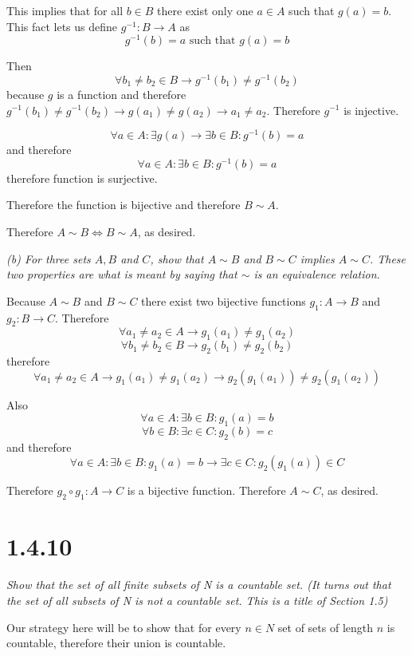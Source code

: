 \documentclass[11pt,oneside,titlepage]{article}
\begin{document}
This implies that for all $b \in B$ there exist only one $a \in A$ such that $g(a) = b$.
This fact lets us define $g^{-1}: B \to A$ as
$$g^{-1}(b) = a \text{ such that } g(a) = b$$

Then
$$\forall b_1 \neq b_2 \in B \to g^{-1}(b_1) \neq g^{-1}(b_2)$$
because $g$ is a function and therefore $g^{-1}(b_1) \neq g^{-1}(b_2) \to
g(a_1) \neq g(a_2) \to a_1 \neq a_2$. Therefore $g^{-1}$ is injective.

$$\forall a \in A: \exists g(a) \to \exists b \in B: g^{-1}(b) = a$$
and therefore
$$\forall a \in A: \exists b \in B: g^{-1}(b) = a$$
therefore function is surjective.

Therefore the function is bijective and therefore $B \sim A$.

Therefore $A \sim B \iff B \sim A $, as desired.


\textit{(b) For three sets $A, B$ and $C$, show that $A \sim B$ and $B \sim C$
  implies $A \sim C$. These two properties are what is meant by saying that $\sim$
  is an equivalence relation.}

Because $A \sim B$ and $B \sim C$ there exist two bijective functions $g_1: A \to B$ and
$g_2: B \to C$.
Therefore
$$\forall a_1 \neq a_2 \in A \to g_1(a_1) \neq g_1(a_2)$$
$$\forall b_1 \neq b_2 \in B \to g_2(b_1) \neq g_2(b_2)$$
therefore
$$\forall a_1 \neq a_2 \in A \to g_1(a_1) \neq g_1(a_2) \to g_2(g_1(a_1)) \neq g_2(g_1(a_2))$$

Also
$$\forall a \in A: \exists b \in B: g_1(a) = b$$
$$\forall b \in B: \exists c \in C: g_2(b) = c$$
and therefore
$$\forall a \in A: \exists b \in B: g_1(a) = b \to  \exists c \in C: g_2(g_1(a)) \in C $$

Therefore $g_2 \circ g_1: A \to C$ is a bijective function. Therefore $A \sim C$, as desired.

\section*{1.4.10}
\textit{Show that the set of all finite subsets of N is a countable set. (It turns out that
  the set of all subsets of N is not a countable set. This is a title of Section 1.5)}

Our strategy here will be to show that for every $n \in N$ set of sets of
length $n$ is countable, therefore their union is countable.
\end{document}
